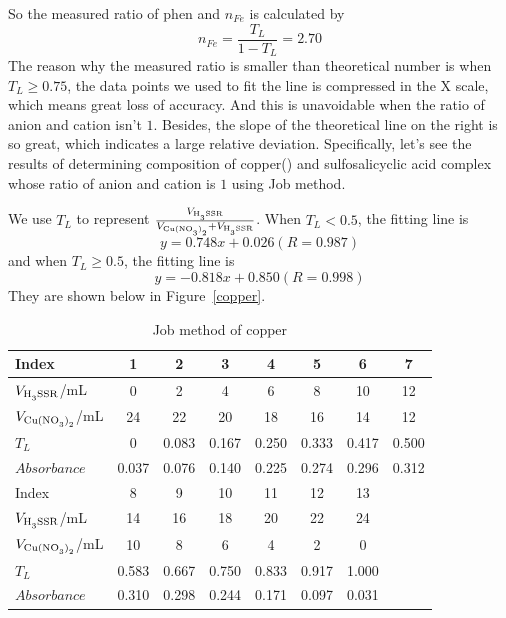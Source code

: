 So the measured ratio of phen and  $n_{Fe}$ is calculated by$$n_{Fe}=\frac{T_L}{1-T_L}=2.70$$The reason why the measured ratio is smaller than theoretical number is when $T_L\geq0.75$, the data points we used to fit the line is compressed in the X scale, which means great loss of accuracy. And this is unavoidable when the ratio of anion and cation isn't $1$. Besides, the slope of the theoretical line on the right is so great, which indicates a large relative deviation. Specifically, let's see the results of determining composition of copper(\uppercase\expandafter{}) and sulfosalicyclic acid complex whose ratio of anion and cation is $1$ using Job method.

We use $T_L$ to represent $\frac{V_{\ce{H3SSR}}}{V_{\ce{Cu(NO3)2}}+V_{\ce{H3SSR}}}$. When $T_L<0.5$, the fitting line is$$y=0.748x+0.026(R=0.987)$$and when $T_L\geq0.5$, the fitting line is$$y=-0.818x+0.850(R=0.998)$$They are shown below in Figure~\ref{copper}.

\begin{table}[H]
	\caption{Job method of copper}
	\label{Tab.Jbm2}
	\begin{tabular}{lccccccc}
	\toprule
	Index					&1		&2		&3		&4		&5		&6		&7		\\
	\midrule
	$V_{\ce{H3SSR}}$/mL 	&0		&2		&4		&6		&8		&10		&12		\\
	$V_{\ce{Cu(NO3)2}}$/mL  &24		&22		&20		&18		&16		&14		&12		\\
	$T_L$					&0		&0.083	&0.167	&0.250	&0.333	&0.417	&0.500	\\
	$Absorbance$ 			&0.037	&0.076	&0.140	&0.225	&0.274	&0.296	&0.312	\\
	\midrule
	Index					&8		&9		&10		&11		&12		&13		&\\
	\midrule
	$V_{\ce{H3SSR}}$/mL 	&14		&16		&18		&20		&22		&24		&\\
	$V_{\ce{Cu(NO3)2}}$/mL  &10		&8		&6		&4		&2		&0		&\\
	$T_L$					&0.583	&0.667	&0.750	&0.833	&0.917	&1.000	&\\
	$Absorbance$ 			&0.310	&0.298	&0.244	&0.171	&0.097	&0.031	&\\
	\bottomrule
	\end{tabular}
\end{table}

